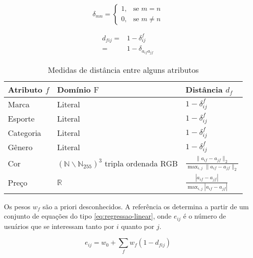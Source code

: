 \begin{equation}
\label{eq:delta}
\delta_{mn} = 
\begin{cases}
1, &\text{se }m=n \\
0, &\text{se }m \neq n
\end{cases} 
\end{equation}

\begin{equation}
\label{eq:dfij}
\begin{split}
d_{fij} =& 1-\delta_{ij}^f \\
    =& 1-\delta_{a_{if} a_{jf}}
\end{split} 
\end{equation}

\begin{table}[hp]
\begin{center}
    \caption{Medidas de distância entre alguns atributos}
    \label{tab:medidas-distancia}
    \begin{tabular}{  | >{\arraybackslash} m{3cm} | >{\arraybackslash} m{3cm} | >{\centering\arraybackslash} m{3cm} | } 
    \hline
    \textbf{Atributo} $f$ & \textbf{Domínio} $\mathrm{F}$ & \textbf{Distância} $d_f$ \\ \hline
    Marca & Literal & $1-\delta^f_{ij}$ \\ \hline    
    Esporte & Literal & $1-\delta^f_{ij}$ \\ \hline
    Categoria & Literal & $1-\delta^f_{ij}$ \\ \hline            
    Gênero & Literal & $1-\delta^f_{ij}$ \\ \hline            
    Cor & $\left(\mathbb{N}\backslash \mathbb{N}_{255}\right)^3$  tripla ordenada RGB & $ \frac{\lVert a_{if}-a_{jf} \rVert_2}{\max_{i,j}{\lVert a_{if}-a_{jf} \rVert_2}} $ \\ \hline
    Preço & $\mathbb{R}$ & $ \frac{\left| a_{if}-a_{jf} \right|}{\max_{i,j}{\left| a_{if}-a_{jf} \right|}} $ \\ \hline                
    \end{tabular}
\end{center}
\end{table}
 
Os pesos $w_f$ são a priori desconhecidos. A referência \cite{symeonidis2007feature} os determina a partir de um conjunto de equações do tipo \ref{eq:regressao-linear}, onde $e_{ij}$ é o número de usuários que se interessam tanto por $i$ quanto por $j$. 

\begin{equation}
\label{eq:regressao-linear} 
    e_{ij} = w_0 + \sum_{f}{w_{f} \left(1-d_{fij}\right)}
\end{equation} 

